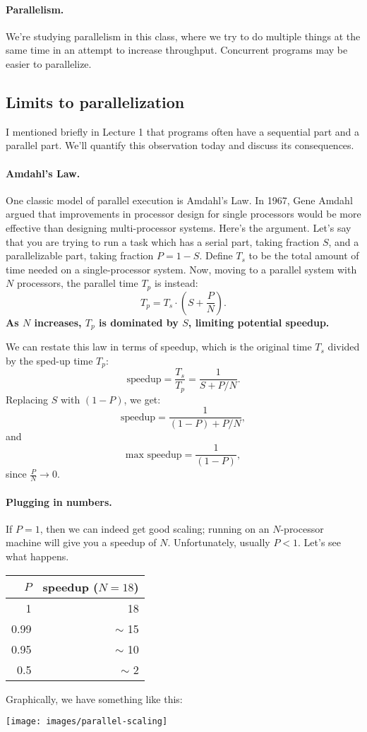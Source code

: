 \paragraph{Parallelism.} We're studying parallelism in this class, where
we try to do multiple things at the same time in an attempt to increase
throughput. Concurrent programs may be easier to parallelize.

\subsection*{Limits to parallelization}
I mentioned briefly in Lecture 1 that programs often have a sequential
part and a parallel part. We'll quantify this observation today
and discuss its consequences.


\paragraph{Amdahl's Law.} One classic model of parallel execution
is Amdahl's Law. In 1967, Gene Amdahl argued that improvements in
processor design for single processors would be more effective than
designing multi-processor systems. Here's the argument. Let's say that
you are trying to run a task which has a serial part, taking fraction 
$S$, and a parallelizable part, taking fraction $P = 1-S$. Define $T_s$
to be the total 
amount of time needed on a single-processor system.
Now, moving to a parallel system with $N$ processors, the parallel
time $T_p$ is instead:
\[ T_p = T_s \cdot (S + \frac{P}{N}). \]
{\bf As $N$ increases, $T_p$ is dominated by $S$, limiting potential
speedup.}

We can restate this law in terms of speedup, which is the 
original time $T_s$ divided by the sped-up time $T_p$:
\[ \mbox{speedup} = \frac{T_s}{T_p} = \frac{1}{S+P/N}. \]
Replacing $S$ with $(1-P)$, we get:
\[ \mbox{speedup} = \frac{1}{(1-P)+P/N}, \]
and
\[ \mbox{max speedup} = \frac{1}{(1-P)}, \]
since $\frac{P}{N} \rightarrow 0$.

\paragraph{Plugging in numbers.} If $P = 1$, then we can indeed get good
scaling; running on an $N$-processor machine will give you a speedup
of $N$. Unfortunately, usually $P < 1$.  Let's see what happens.

\begin{center}
\begin{tabular}{r|r}
$P$ & speedup ($N=18$) \\ \hline
1 & 18 \\
0.99 & $\sim$ 15 \\
0.95 & $\sim$ 10 \\
0.5 & $\sim$ 2
\end{tabular}
\end{center}
Graphically, we have something like this:
\begin{center}
  \texttt{[image: images/parallel-scaling]}
\end{center}


